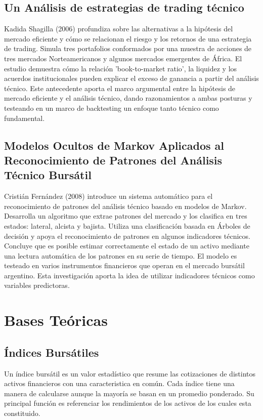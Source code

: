 \documentclass[a4paper,12pt]{Latex/Classes/PhDthesisPSnPDF}
\begin{document}
\subsection{Un Análisis de estrategias de trading técnico}

Kadida Shagilla (2006) profundiza sobre las alternativas a la hipótesis del mercado eficiente y cómo se relacionan el riesgo y los retornos de una estrategia de trading. Simula tres portafolios conformados por una muestra de acciones de tres mercados Norteamericanos y algunos mercados emergentes de África. El estudio demuestra cómo la relación 'book-to-market ratio', la liquidez y los acuerdos institucionales pueden explicar el exceso de ganancia a partir del análisis técnico. Este antecedente aporta el marco argumental entre la hipótesis de mercado eficiente y el análisis técnico, dando razonamientos a ambas posturas y testeando en un marco de backtesting un enfoque tanto técnico como fundamental.

\subsection{Modelos Ocultos de Markov Aplicados al Reconocimiento de Patrones del Análisis Técnico Bursátil}

Cristián Fernández (2008) introduce un sistema automático para el reconocimiento de patrones del análisis técnico basado en modelos de Markov. Desarrolla un algoritmo que extrae patrones del mercado y los clasifica en tres estados: lateral, alcista y bajista. Utiliza una clasificación basada en Árboles de decisión y apoya el reconocimiento de patrones en algunos indicadores técnicos. Concluye que es posible estimar correctamente el estado de un activo mediante una lectura automática de los patrones en su serie de tiempo. El modelo es testeado en varios instrumentos financieros que operan en el mercado bursátil argentino. Esta investigación aporta la idea de utilizar indicadores técnicos como variables predictoras.


\section{Bases Teóricas}

\subsection{Índices Bursátiles}

Un índice bursátil es un valor estadístico que resume las cotizaciones de distintos activos financieros con una caracteristica en común. Cada índice tiene una manera de calcularse aunque la mayoría se basan en un promedio ponderado. Su principal función es referenciar los rendimientos de los activos de los cuales esta constituido.
\end{document}

